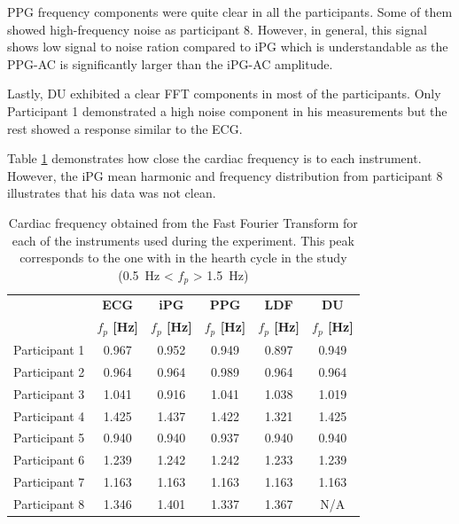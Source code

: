 PPG frequency components were quite clear in all the participants. Some of them showed high-frequency noise as participant 8. However, in general, this signal shows low signal to noise ration compared to iPG which is understandable as the PPG-AC is significantly larger than the iPG-AC amplitude.

Lastly, DU exhibited a clear FFT components in most of the participants. Only Participant 1 demonstrated a high noise component in his measurements but the rest showed a response similar to the ECG. 

Table \ref{tbl:fft} demonstrates how close the cardiac frequency is to each instrument. However, the iPG mean harmonic and frequency distribution from participant 8 illustrates that his data was not clean.


\begin{table}[!htbp]
	\caption[Peak frequency calculated obtained form Fast Fourier Transform]{Cardiac frequency obtained from the Fast Fourier Transform for each of the instruments used during the experiment. This peak corresponds to the one with in the hearth cycle in the study (\SI{0.5}{\hertz} < $f_p$ > \SI{1.5}{\hertz})}
	\label{tbl:fft}
	\centering 
	\begin{tabular}{lccccc}
		\toprule
		& \textbf{ECG}
		& \textbf{iPG}
		& \textbf{PPG}
		& \textbf{LDF}
		& \textbf{DU} \\
		& \textbf{$f_p$ [\si{\hertz}]}		
		& \textbf{$f_p$ [\si{\hertz}]}		
		& \textbf{$f_p$ [\si{\hertz}]}
		& \textbf{$f_p$ [\si{\hertz}]}
		& \textbf{$f_p$ [\si{\hertz}]}\\\midrule
	    Participant 1    &     0.967    &     0.952    &     0.949    &     0.897    &     0.949    \\  
		Participant 2    &     0.964    &     0.964    &     0.989    &     0.964    &     0.964    \\  
		Participant 3    &     1.041    &     0.916    &     1.041    &     1.038    &     1.019    \\  
		Participant 4    &     1.425    &     1.437    &     1.422    &     1.321    &     1.425    \\  
		Participant 5    &     0.940    &     0.940    &     0.937    &     0.940    &     0.940    \\  
		Participant 6    &     1.239    &     1.242    &     1.242    &     1.233    &     1.239    \\  
		Participant 7    &     1.163    &     1.163    &     1.163    &     1.163    &     1.163    \\  
		Participant 8    &     1.346    &     1.401    &     1.337    &     1.367    &     N/A    \\  
 
	\bottomrule
	\end{tabular}
\end{table}


